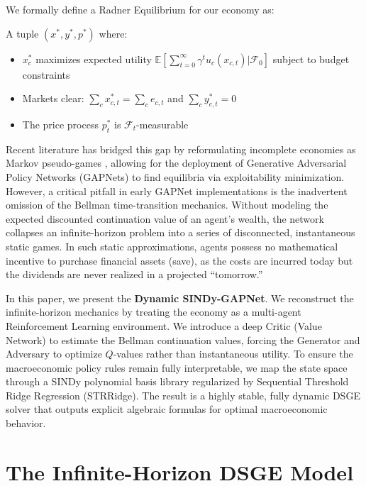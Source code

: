 \documentclass[11pt, a4paper]{article}
\begin{document}
We formally define a Radner Equilibrium for our economy as:
\begin{definition}
A tuple $(x^*, y^*, p^*)$ where:
\begin{itemize}
    \item $x_c^*$ maximizes expected utility $\mathbb{E}[\sum_{t=0}^\infty \gamma^t u_c(x_{c,t}) | \mathcal{F}_0]$ subject to budget constraints
    \item Markets clear: $\sum_c x_{c,t}^* = \sum_c e_{c,t}$ and $\sum_c y_{c,t}^* = 0$
    \item The price process $p_t^*$ is $\mathcal{F}_t$-measurable
\end{itemize}
\end{definition}

Recent literature has bridged this gap by reformulating incomplete economies as Markov pseudo-games \cite{goktas2025infinite}, allowing for the deployment of Generative Adversarial Policy Networks (GAPNets) to find equilibria via exploitability minimization. However, a critical pitfall in early GAPNet implementations is the inadvertent omission of the Bellman time-transition mechanics. Without modeling the expected discounted continuation value of an agent's wealth, the network collapses an infinite-horizon problem into a series of disconnected, instantaneous static games. In such static approximations, agents possess no mathematical incentive to purchase financial assets (save), as the costs are incurred today but the dividends are never realized in a projected ``tomorrow.''

In this paper, we present the \textbf{Dynamic SINDy-GAPNet}. We reconstruct the infinite-horizon mechanics by treating the economy as a multi-agent Reinforcement Learning environment. We introduce a deep Critic (Value Network) to estimate the Bellman continuation values, forcing the Generator and Adversary to optimize $Q$-values rather than instantaneous utility. To ensure the macroeconomic policy rules remain fully interpretable, we map the state space through a SINDy polynomial basis library regularized by Sequential Threshold Ridge Regression (STRRidge). The result is a highly stable, fully dynamic DSGE solver that outputs explicit algebraic formulas for optimal macroeconomic behavior.

\section{The Infinite-Horizon DSGE Model}
\end{document}
